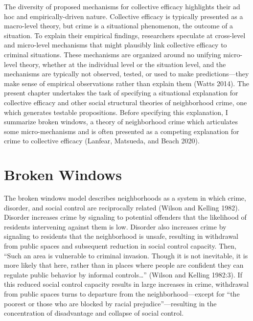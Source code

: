 \documentclass [11pt, proquest] {uwthesis}[2015/03/03]
\begin{document}
The diversity of proposed mechanisms for collective efficacy highlights their ad hoc and empirically-driven nature. Collective efficacy is typically presented as a macro-level theory, but crime is a situational phenomenon, the outcome of a situation. To explain their empirical findings, researchers speculate at cross-level and micro-level mechanisms that might plausibly link collective efficacy to criminal situations. These mechanisms are organized around no unifying micro-level theory, whether at the individual level or the situation level, and the mechanisms are typically not observed, tested, or used to make predictions---they make sense of empirical observations rather than explain them (Watts 2014). The present chapter undertakes the task of specifying a situational explanation for collective efficacy and other social structural theories of neighborhood crime, one which generates testable propositions. Before specifying this explanation, I summarize broken windows, a theory of neighborhood crime which articulates some micro-mechanisms and is often presented as a competing explanation for crime to collective efficacy (Lanfear, Matsueda, and Beach 2020).

\hypertarget{broken-windows}{%
\section{Broken Windows}\label{broken-windows}}

The broken windows model describes neighborhoods as a system in which crime, disorder, and social control are reciprocally related (Wilson and Kelling 1982). Disorder increases crime by signaling to potential offenders that the likelihood of residents intervening against them is low. Disorder also increases crime by signaling to residents that the neighborhood is unsafe, resulting in withdrawal from public spaces and subsequent reduction in social control capacity. Then, ``Such an area is vulnerable to criminal invasion. Though it is not inevitable, it is more likely that here, rather than in places where people are confident they can regulate public behavior by informal controls\ldots{}'' (Wilson and Kelling 1982:3). If this reduced social control capacity results in large increases in crime, withdrawal from public spaces turns to departure from the neighborhood---except for ``the poorest or those who are blocked by racial prejudice''---resulting in the concentration of disadvantage and collapse of social control.
\end{document}
